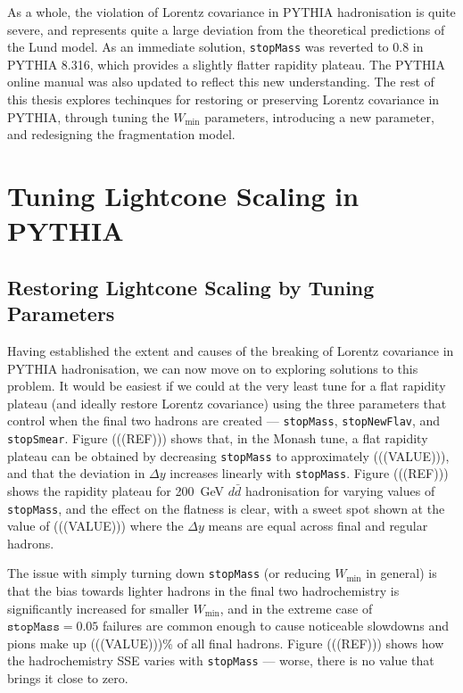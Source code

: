 \documentclass[12pt,a4paper]{report}
\begin{document}
As a whole, the violation of Lorentz covariance in PYTHIA hadronisation is quite severe, and represents quite a large deviation from the theoretical predictions of the Lund model. As an immediate solution, \texttt{stopMass} was reverted to 0.8 in PYTHIA 8.316, which provides a slightly flatter rapidity plateau. The PYTHIA online manual was also updated to reflect this new understanding. The rest of this thesis explores techinques for restoring or preserving Lorentz covariance in PYTHIA, through tuning the $W_\text{min}$ parameters, introducing a new parameter, and redesigning the fragmentation model.

\chapter{Tuning Lightcone Scaling in PYTHIA}
\label{chap:tuning}
\section{Restoring Lightcone Scaling by Tuning Parameters}
Having established the extent and causes of the breaking of Lorentz covariance in PYTHIA hadronisation, we can now move on to exploring solutions to this problem. It would be easiest if we could at the very least tune for a flat rapidity plateau (and ideally restore Lorentz covariance) using the three parameters that control when the final two hadrons are created --- \texttt{stopMass}, \texttt{stopNewFlav}, and \texttt{stopSmear}. Figure (((REF))) shows that, in the Monash tune, a flat rapidity plateau can be obtained by decreasing \texttt{stopMass} to approximately (((VALUE))), and that the deviation in $\Delta y$ increases linearly with \texttt{stopMass}. Figure (((REF))) shows the rapidity plateau for \qty{200}{\giga\electronvolt} $d\bar{d}$ hadronisation for varying values of \texttt{stopMass}, and the effect on the flatness is clear, with a sweet spot shown at the value of (((VALUE))) where the $\Delta y$ means are equal across final and regular hadrons.

The issue with simply turning down \texttt{stopMass} (or reducing $W_\text{min}$ in general) is that the bias towards lighter hadrons in the final two hadrochemistry is significantly increased for smaller $W_\text{min}$, and in the extreme case of $\texttt{stopMass} = 0.05$ failures are common enough to cause noticeable slowdowns and pions make up (((VALUE)))\% of all final hadrons. Figure (((REF))) shows how the hadrochemistry SSE varies with \texttt{stopMass} --- worse, there is no value that brings it close to zero.
\end{document}
